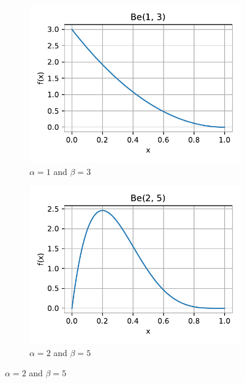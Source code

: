 \begin{figure}[H]
    \hfill
    \begin{subfigure}{0.3\textwidth}
        \centering
        \includegraphics[width=1\textwidth]{resources/figures/q1-beta_distr-alpha_1-beta_3.pdf}
        \caption{$\alpha = 1$ and $\beta = 3$}
        \label{q1-beta-distr-a_1-b_3}
    \end{subfigure}
    \hfill
    \begin{subfigure}{0.3\textwidth}
        \centering
        \includegraphics[width=1\textwidth]{resources/figures/q1-beta_distr-alpha_2-beta_5.pdf}
        \caption{$\alpha = 2$ and $\beta = 5$}
        \label{q1-beta-distr-a_2-b_5}
    \end{subfigure}
    \vfill
    \vspace{0.5cm}

\end{figure}
